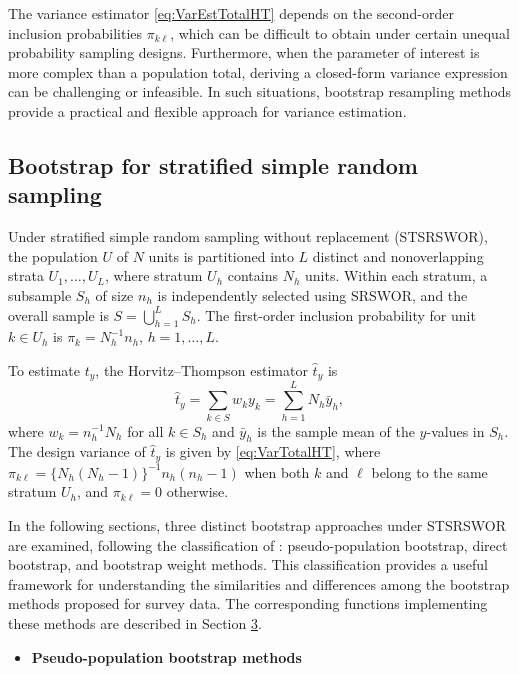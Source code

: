 The variance estimator \eqref{eq:VarEstTotalHT} depends on the second-order inclusion probabilities \(\pi_{k\textrm{$\ell$}}\), which can be difficult to obtain under certain unequal probability sampling designs. Furthermore, when the parameter of interest is more complex than a population total, deriving a closed-form variance expression can be challenging or infeasible. In such situations, bootstrap resampling methods provide a practical and flexible approach for variance estimation.

\subsection{Bootstrap for stratified simple random sampling}\label{Boot_STSRSWOR}

Under stratified simple random sampling without replacement (STSRSWOR), the population \(U\) of \(N\) units is partitioned into \(L\) distinct and nonoverlapping strata \(U_1, \ldots, U_L\), where stratum \(U_h\) contains \(N_h\) units. Within each stratum, a subsample \(\textrm{$S$}_h\) of size \(n_h\) is independently selected using SRSWOR, and the overall sample is \(\textrm{$S$}= \bigcup_{h=1}^L \textrm{$S$}_h\). The first-order inclusion probability for unit \(k \in U_h\) is \(\pi_k = N_h^{-1}n_h\), \(h = 1, \ldots, L\).

To estimate \(t_y\), the Horvitz--Thompson estimator \(\hat t_y\) is
\[
    \hat{t}_y=\sum_{k \in \textrm{$S$}} w_{k} y_{k} = \sum_{h=1}^{L} N_h \bar y_h,
\]
where \(w_k=n_h^{-1}N_h\) for all \(k \in \textrm{$S$}_h\) and \(\bar y_h\) is the sample mean of the \(y\)-values in \(\textrm{$S$}_h\). The design variance of \(\hat t_y\) is given by \eqref{eq:VarTotalHT}, where \(\pi_{k\textrm{$\ell$}}=\{N_h(N_h-1)\}^{-1}{n_h(n_h-1)}\) when both \(k\) and \(\textrm{$\ell$}\) belong to the same stratum \(U_h\), and \(\pi_{k\textrm{$\ell$}}=0\) otherwise.

In the following sections, three distinct bootstrap approaches under STSRSWOR are examined, following the classification of \citet{Mashreghi:Haziza:Leger:2016}: pseudo-population bootstrap, direct bootstrap, and bootstrap weight methods. This classification provides a useful framework for understanding the similarities and differences among the bootstrap methods proposed for survey data. The corresponding  functions implementing these methods are described in Section \hyperref[sec:pkgbootsurv]{3}.

\begin{itemize}
\tightlist
\item
  \textbf{Pseudo-population bootstrap methods}
\end{itemize}

